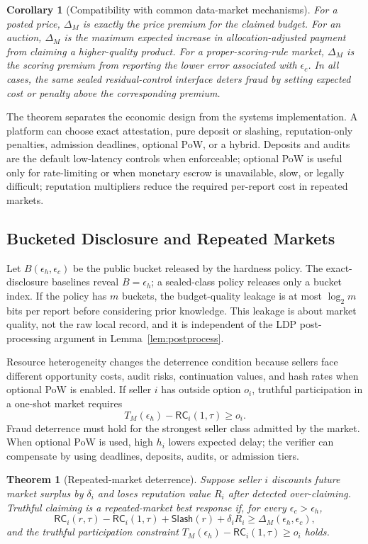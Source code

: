 \documentclass[conference]{IEEEtran}
\newtheorem{theorem}{Theorem}[section]
\newtheorem{corollary}{Corollary}[section]
\newcommand{\eps}{\epsilon}
\begin{document}
\begin{corollary}[Compatibility with common data-market mechanisms]
For a posted price, $\Delta_M$ is exactly the price premium for the claimed budget. For an auction, $\Delta_M$ is the maximum expected increase in allocation-adjusted payment from claiming a higher-quality product. For a proper-scoring-rule market, $\Delta_M$ is the scoring premium from reporting the lower error associated with $\eps_c$. In all cases, the same sealed residual-control interface deters fraud by setting expected cost or penalty above the corresponding premium.
\end{corollary}

The theorem separates the economic design from the systems implementation. A platform can choose exact attestation, pure deposit or slashing, reputation-only penalties, admission deadlines, optional PoW, or a hybrid. Deposits and audits are the default low-latency controls when enforceable; optional PoW is useful only for rate-limiting or when monetary escrow is unavailable, slow, or legally difficult; reputation multipliers reduce the required per-report cost in repeated markets.

\subsection{Bucketed Disclosure and Repeated Markets}
\label{subsec:repeated}

Let $B(\eps_h,\eps_c)$ be the public bucket released by the hardness policy. The exact-disclosure baselines reveal $B=\eps_h$; a sealed-class policy releases only a bucket index. If the policy has $m$ buckets, the budget-quality leakage is at most $\log_2 m$ bits per report before considering prior knowledge. This leakage is about market quality, not the raw local record, and it is independent of the LDP post-processing argument in Lemma~\ref{lem:postprocess}.

Resource heterogeneity changes the deterrence condition because sellers face different opportunity costs, audit risks, continuation values, and hash rates when optional PoW is enabled. If seller $i$ has outside option $o_i$, truthful participation in a one-shot market requires
\[
T_M(\eps_h)-\mathsf{RC}_i(1,\tau)\ge o_i.
\]
Fraud deterrence must hold for the strongest seller class admitted by the market. When optional PoW is used, high $h_i$ lowers expected delay; the verifier can compensate by using deadlines, deposits, audits, or admission tiers.

\begin{theorem}[Repeated-market deterrence]
\label{thm:repeated}
Suppose seller $i$ discounts future market surplus by $\delta_i$ and loses reputation value $R_i$ after detected over-claiming. Truthful claiming is a repeated-market best response if, for every $\eps_c>\eps_h$,
\[
\mathsf{RC}_i(r,\tau)-\mathsf{RC}_i(1,\tau)+\mathsf{Slash}(r)+\delta_i R_i
\ge \Delta_M(\eps_h,\eps_c),
\]
and the truthful participation constraint $T_M(\eps_h)-\mathsf{RC}_i(1,\tau)\ge o_i$ holds.
\end{theorem}
\end{document}
